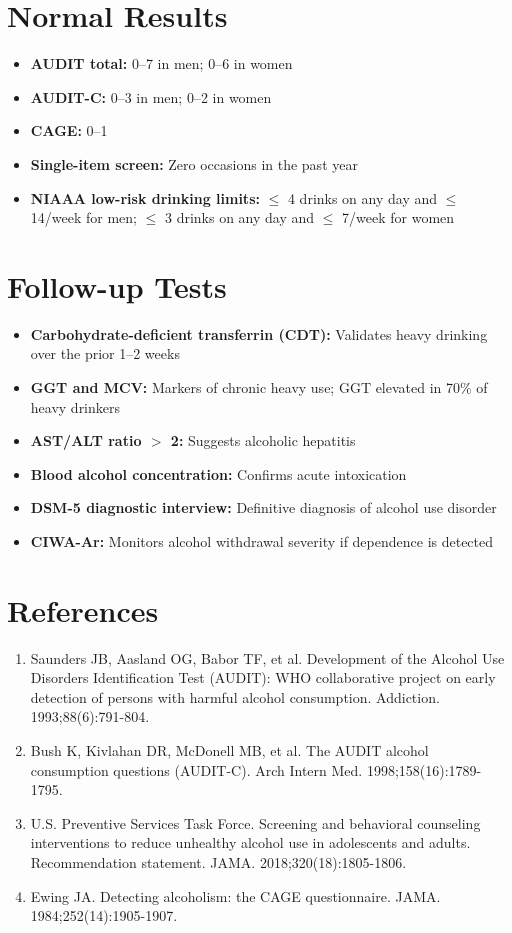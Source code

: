 \section*{Normal Results}
\begin{itemize}
  \item \textbf{AUDIT total:} 0--7 in men; 0--6 in women
  \item \textbf{AUDIT-C:} 0--3 in men; 0--2 in women
  \item \textbf{CAGE:} 0--1
  \item \textbf{Single-item screen:} Zero occasions in the past year
  \item \textbf{NIAAA low-risk drinking limits:} $\leq$ 4 drinks on any day and $\leq$ 14/week for men; $\leq$ 3 drinks on any day and $\leq$ 7/week for women
\end{itemize}

\section*{Follow-up Tests}
\begin{itemize}
  \item \textbf{Carbohydrate-deficient transferrin (CDT):} Validates heavy drinking over the prior 1--2 weeks
  \item \textbf{GGT and MCV:} Markers of chronic heavy use; GGT elevated in 70\% of heavy drinkers
  \item \textbf{AST/ALT ratio $>$ 2:} Suggests alcoholic hepatitis
  \item \textbf{Blood alcohol concentration:} Confirms acute intoxication
  \item \textbf{DSM-5 diagnostic interview:} Definitive diagnosis of alcohol use disorder
  \item \textbf{CIWA-Ar:} Monitors alcohol withdrawal severity if dependence is detected
\end{itemize}

\section*{References}
\begin{enumerate}
  \item Saunders JB, Aasland OG, Babor TF, et al. Development of the Alcohol Use Disorders Identification Test (AUDIT): WHO collaborative project on early detection of persons with harmful alcohol consumption. Addiction. 1993;88(6):791-804.
  \item Bush K, Kivlahan DR, McDonell MB, et al. The AUDIT alcohol consumption questions (AUDIT-C). Arch Intern Med. 1998;158(16):1789-1795.
  \item U.S. Preventive Services Task Force. Screening and behavioral counseling interventions to reduce unhealthy alcohol use in adolescents and adults. Recommendation statement. JAMA. 2018;320(18):1805-1806.
  \item Ewing JA. Detecting alcoholism: the CAGE questionnaire. JAMA. 1984;252(14):1905-1907.
\end{enumerate}

\clearpage